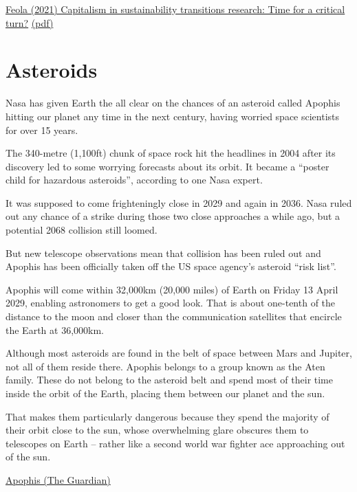 \documentclass[
]{book}
\begin{document}
\href{https://www.sciencedirect.com/science/article/pii/S2210422418301576}{Feola (2021) Capitalism in sustainability transitions research: Time for a critical turn?}
\href{pdf/Feola_2021_Capitalism_in_Sustainable_Transitions_Research.pdf}{(pdf)}

\hypertarget{asteroids}{%
\chapter{Asteroids}\label{asteroids}}

Nasa has given Earth the all clear on the chances of an asteroid called Apophis hitting our planet any time in the next century, having worried space scientists for over 15 years.

The 340-metre (1,100ft) chunk of space rock hit the headlines in 2004 after its discovery led to some worrying forecasts about its orbit. It became a ``poster child for hazardous asteroids'', according to one Nasa expert.

It was supposed to come frighteningly close in 2029 and again in 2036. Nasa ruled out any chance of a strike during those two close approaches a while ago, but a potential 2068 collision still loomed.

But new telescope observations mean that collision has been ruled out and Apophis has been officially taken off the US space agency's asteroid ``risk list''.

Apophis will come within 32,000km (20,000 miles) of
Earth on Friday 13 April 2029, enabling astronomers to get a good look. That is about one-tenth of the distance to the moon and closer than the communication satellites that encircle the Earth at 36,000km.

Although most asteroids are found in the belt of space between Mars and Jupiter, not all of them reside there. Apophis belongs to a group known as the Aten family. These do not belong to the asteroid belt and spend most of their time inside the orbit of the Earth, placing them between our planet and the sun.

That makes them particularly dangerous because they spend the majority of their orbit close to the sun, whose overwhelming glare obscures them to telescopes on Earth -- rather like a second world war fighter ace approaching out of the sun.

\href{https://www.theguardian.com/science/2021/mar/27/much-feared-asteroid-apophis-wont-hit-earth-for-at-least-100-years-nasa-says}{Apophis (The Guardian)}
\end{document}
